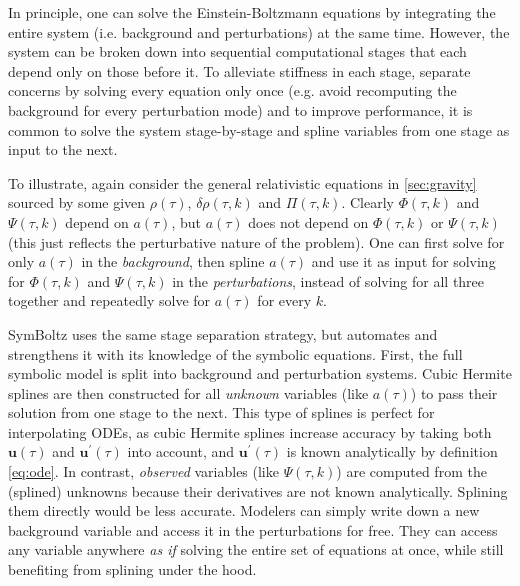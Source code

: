 \documentclass{aa}
\begin{document}
In principle, one can solve the Einstein-Boltzmann equations by integrating the entire system (i.e. background and perturbations) at the same time.
However, the system can be broken down into sequential computational stages that each depend only on those before it.
To alleviate stiffness in each stage, separate concerns by solving every equation only once (e.g. avoid recomputing the background for every perturbation mode) and to improve performance, it is common to solve the system stage-by-stage and spline variables from one stage as input to the next.

To illustrate, again consider the general relativistic equations in \cref{sec:gravity} sourced by some given $\rho(\tau)$, $\delta\rho(\tau,k)$ and $\Pi(\tau,k)$.
Clearly $\Phi(\tau,k)$ and $\Psi(\tau,k)$ depend on $a(\tau)$, but $a(\tau)$ does not depend on $\Phi(\tau,k)$ or $\Psi(\tau,k)$ (this just reflects the perturbative nature of the problem).
One can first solve for only $a(\tau)$ in the \textit{background}, then spline $a(\tau)$ and use it as input for solving for $\Phi(\tau,k)$ and $\Psi(\tau,k)$ in the \textit{perturbations}, instead of solving for all three together and repeatedly solve for $a(\tau)$ for every $k$.

SymBoltz uses the same stage separation strategy, but automates and strengthens it with its knowledge of the symbolic equations.
First, the full symbolic model is split into background and perturbation systems.
Cubic Hermite splines are then constructed for all \emph{unknown} variables (like $a(\tau)$) to pass their solution from one stage to the next.
This type of splines is perfect for interpolating ODEs, as cubic Hermite splines increase accuracy by taking both $\boldsymbol{u}(\tau)$ and $\boldsymbol{u}^\prime(\tau)$ into account, and $\boldsymbol{u}^\prime(\tau)$ is known analytically by definition \eqref{eq:ode}.
In contrast, \emph{observed} variables (like $\Psi(\tau,k)$) are computed from the (splined) unknowns because their derivatives are not known analytically.
Splining them directly would be less accurate.
Modelers can simply write down a new background variable and access it in the perturbations for free.
They can access any variable anywhere \emph{as if} solving the entire set of equations at once, while still benefiting from splining under the hood.
\end{document}
